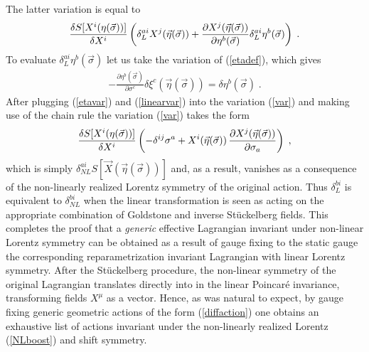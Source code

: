 \documentclass[%
 reprint,
 amsmath,amssymb,
 aps,
]{revtex4-1}
\begin{document}
The latter variation is equal to
\begin{gather}
\label{var}
 {\delta S[X^i(\eta(\vec{\sigma}))]\over \delta X^i}
  \left(\delta^{a i}_L X^j(\vec{\eta}(\vec{\sigma})) +
    \frac{\partial X^j (\vec{\eta}(\vec{\sigma}))}{\partial \eta^b(\vec{\sigma})}
    \delta^{a i}_L \eta^b(\vec{\sigma})\right) \; .
\end{gather}
To evaluate $\delta^{a i}_L \eta^b(\vec{\sigma})$ let us take the variation of (\ref{etadef}), which gives
\begin{eqnarray}
\label{etavar}
    - \frac{\partial \eta^b (\vec{\sigma})}{\partial \sigma^c} \delta \xi^c (\vec{\eta}(\vec{\sigma}))
    = \delta \eta^b(\vec{\sigma}) \; .
    \end{eqnarray}
    After plugging (\ref{etavar}) and (\ref{linearvar}) into the variation (\ref{var}) and making use of the chain rule the variation
     (\ref{var}) takes the form
\begin{eqnarray}
 {\delta S[X^i(\eta(\vec{\sigma}))]\over \delta X^i} \left( -\delta^{i j} \sigma^a + X^i(\vec{\eta}(\vec{\sigma})) \,
    \frac{\partial X^j(\vec{\eta}(\vec{\sigma}))}{\partial \sigma_a} \right)
    \; ,
    \nonumber
\end{eqnarray}
which is simply $ \delta^{a i}_{NL} S \left[ \vec{X}(\vec{\eta}(\vec{\sigma}) )\right]$ and, as a result, vanishes as a consequence of
the non-linearly realized Lorentz symmetry of the original action.
Thus $\delta^{b i}_L$ is equivalent to $\delta^{b i}_{NL}$ when the linear transformation
is seen as acting on the appropriate combination of Goldstone and inverse
St\"uckelberg fields.
This completes the proof that a \emph{generic} effective Lagrangian invariant under non-linear Lorentz symmetry can
be obtained as a result of gauge fixing to the static gauge the corresponding reparametrization invariant Lagrangian
with linear Lorentz symmetry. After the St\"uckelberg procedure, the non-linear symmetry of the original Lagrangian
translates directly into in the linear Poincar\'e invariance, transforming fields $X^{\mu}$ as a vector.
Hence, as was natural to expect, by gauge fixing generic geometric actions of the form (\ref{diffaction}) one obtains an exhaustive list
of actions invariant under the non-linearly realized  Lorentz (\ref{NLboost}) and shift symmetry.

\end{document}

